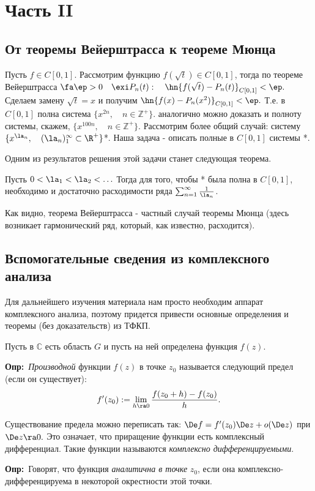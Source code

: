 \documentclass[a4paper]{article}
\def\defin{\noindent\textbf{Опр:}\ }
\begin{document}
\newpage
\section{Часть II}
\subsection{От теоремы Вейерштрасса к теореме Мюнца}
Пусть $f\in C[0,1]$. Рассмотрим функцию $f(\sqrt{t})\in C[0,1]$, тогда по теореме Вейерштрасса
$\fa\ep>0\quad\exi P_n(t):\quad\hn{f(\sqrt{t})-P_n(t)}_{C[0,1]}<\ep.$ Сделаем замену
$\sqrt{t}=x$ и получим $\hn{f(x)-P_n(x^2)}_{C[0,1]}<\ep.$ Т.е. в $C[0,1]$ полна система
$\{x^{2n},\quad n\in\mathbb{Z}^{+}\}$. аналогично можно доказать и полноту системы, скажем, $\{x^{100n},\quad
n\in\mathbb{Z}^{+}\}$. Рассмотрим более общий случай: систему
$\{x^{\la_n},\quad(\la_n)_1^{\infty}\subset\R ^{+}\}$*. Наша задача - описать полные в
$C[0,1]$ системы *.

Одним из результатов решения этой задачи станет следующая теорема.
\begin{theorems}[Мюнц 1914г.]
Пусть $0<\la_1<\la_2<\ldots$ Тогда для того, чтобы * была
полна в $C[0,1]$, необходимо и достаточно расходимости ряда
$\sum_{n=1}^{\infty}\frac1{\la_n}$.
\end{theorems}
Как видно, теорема Вейерштрасса - частный случай теоремы Мюнца
(здесь возникает гармонический ряд, который, как известно,
расходится).

\subsection{Вспомогательные сведения из комплексного анализа}
Для дальнейшего изучения материала нам просто необходим аппарат комплексного анализа, поэтому придется
привести основные определения и теоремы (без доказательств) из ТФКП.

Пусть в $\mathbb{C}$ есть область $G$ и пусть на ней определена
функция $f(z)$.

\defin \emph{Производной} функции $f(z)$ в точке
$z_0$ называется следующий предел (если он существует):
$$f'(z_0):=\lim_{h\ra0}\frac{f(z_0+h)-f(z_0)}{h}.$$

Существование предела можно переписать так: $\De
f=f'(z_0)\De z+o(\De z)$ при $\De z\ra0.$ Это
означает, что приращение функции есть комплексный дифференциал.
Такие функции называются \emph{комплексно дифференцируемыми}.

\defin Говорят, что функция \emph{аналитична в
точке} $z_0$, если она комплексно-дифференцируема в некоторой
окрестности этой точки.
\end{document}
